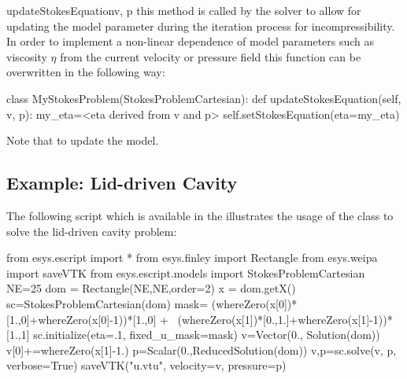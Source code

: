 \begin{methoddesc}[StokesProblemCartesian]{updateStokesEquation}{v, p}
this method is called by the solver to allow for updating the model parameter during the iteration process for 
incompressibility. In order to implement a non-linear dependence of model parameters such as viscosity $\eta$
from the current velocity  or pressure field  this function can be overwritten in the following way:
\begin{python}
    class MyStokesProblem(StokesProblemCartesian):
       def updateStokesEquation(self, v, p):
           my_eta=<eta derived from v and p>
           self.setStokesEquation(eta=my_eta)
\end{python}
Note that  to update the model. 
\end{methoddesc}

\subsection{Example: Lid-driven Cavity}
The following script 
which is available in the \ExampleDirectory illustrates the usage of the
 class to solve the lid-driven cavity problem:
\begin{python}
  from esys.escript import *
  from esys.finley import Rectangle
  from esys.weipa import saveVTK
  from esys.escript.models import StokesProblemCartesian
  NE=25
  dom = Rectangle(NE,NE,order=2)
  x = dom.getX()
  sc=StokesProblemCartesian(dom)
  mask= (whereZero(x[0])*[1.,0]+whereZero(x[0]-1))*[1.,0] + \
        (whereZero(x[1])*[0.,1.]+whereZero(x[1]-1))*[1.,1]
  sc.initialize(eta=.1, fixed_u_mask=mask)
  v=Vector(0., Solution(dom))
  v[0]+=whereZero(x[1]-1.)
  p=Scalar(0.,ReducedSolution(dom))
  v,p=sc.solve(v, p, verbose=True)
  saveVTK("u.vtu", velocity=v, pressure=p)
\end{python}


